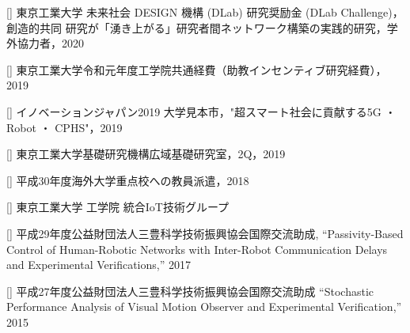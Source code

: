 \documentclass[letterpaper]{article}
\newcounter{misc}
\begin{document}
[] 
東京工業大学 未来社会 DESIGN 機構 (DLab) 研究奨励金 (DLab Challenge)，創造的共同 研究が「湧き上がる」研究者間ネットワーク構築の実践的研究，学外協力者，2020 \\
\addtocounter{misc}{-1}

[] 
  東京工業大学令和元年度工学院共通経費（助教インセンティブ研究経費），2019 \\
\addtocounter{misc}{-1}

[] 
  イノベーションジャパン2019 大学見本市，"超スマート社会に貢献する5G ・ Robot ・ CPHS"，2019 \\
\addtocounter{misc}{-1}

[] 
  東京工業大学基礎研究機構広域基礎研究室，2Q，2019 \\
\addtocounter{misc}{-1}

[] 
  平成30年度海外大学重点校への教員派遣，2018 \\
\addtocounter{misc}{-1}

[] 
  東京工業大学 工学院 統合IoT技術グループ \\
\addtocounter{misc}{-1}

[] 
  平成29年度公益財団法人三豊科学技術振興協会国際交流助成,
  ``Passivity-Based Control of Human-Robotic Networks with Inter-Robot Communication Delays and Experimental Verifications,'' 2017 \\
\addtocounter{misc}{-1}

[]  
  平成27年度公益財団法人三豊科学技術振興協会国際交流助成
  ``Stochastic Performance Analysis of Visual Motion Observer and Experimental Verification,'' 2015 \\
\addtocounter{misc}{-1}


\bigskip

\end{document}
